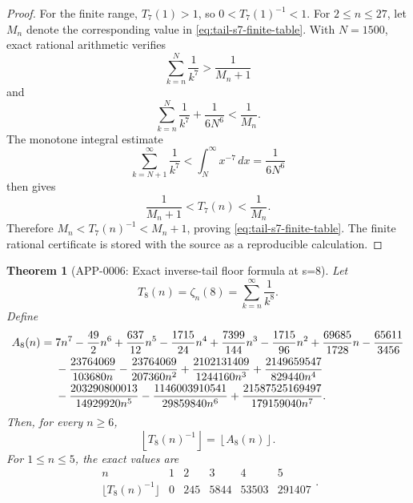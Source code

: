 \documentclass[11pt]{article}
\numberwithin{equation}{section}
\newtheorem{theorem}{Theorem}[section]
\theoremstyle{definition}
\theoremstyle{remark}
\newcommand{\1}{\mathbf 1}
\begin{document}
\begin{proof}
For the finite range, \(T_7(1)>1\), so \(0<T_7(1)^{-1}<1\).  For \(2\le n\le27\), let \(M_n\) denote the corresponding value in \eqref{eq:tail-s7-finite-table}.  With \(N=1500\), exact rational arithmetic verifies
\begin{equation}
\label{eq:tail-s7-finite-lower}
\sum_{k=n}^{N}\frac1{k^7}>\frac1{M_n+1}
\end{equation}
and
\begin{equation}
\label{eq:tail-s7-finite-upper}
\sum_{k=n}^{N}\frac1{k^7}+\frac1{6N^6}<\frac1{M_n}.
\end{equation}
The monotone integral estimate
\begin{equation}
\label{eq:tail-s7-integral-tail}
\sum_{k=N+1}^{\infty}\frac1{k^7}<\int_N^\infty x^{-7}\,dx=\frac1{6N^6}
\end{equation}
then gives
\begin{equation}
\label{eq:tail-s7-finite-window}
\frac1{M_n+1}<T_7(n)<\frac1{M_n}.
\end{equation}
Therefore \(M_n<T_7(n)^{-1}<M_n+1\), proving \eqref{eq:tail-s7-finite-table}.  The finite rational certificate is stored with the source as a reproducible calculation.
\end{proof}

\begin{theorem}[APP-0006: Exact inverse-tail floor formula at s=8]
\label{thm:tail-s8-floor}
Let
\begin{equation}
\label{eq:tail-s8}
T_8(n)=\zeta_n(8)=\sum_{k=n}^{\infty}\frac1{k^8}.
\end{equation}
Define
\begin{align}
\label{eq:tail-s8-a}
A_8(n)
={}&7n^7-\frac{49}{2}n^6+\frac{637}{12}n^5-\frac{1715}{24}n^4
+\frac{7399}{144}n^3-\frac{1715}{96}n^2+\frac{69685}{1728}n-\frac{65611}{3456}\notag\\
&-\frac{23764069}{103680n}
-\frac{23764069}{207360n^2}
+\frac{2102131409}{1244160n^3}
+\frac{2149659547}{829440n^4}\notag\\
&-\frac{203290800013}{14929920n^5}
-\frac{1146003910541}{29859840n^6}
+\frac{21587525169497}{179159040n^7}.
\end{align}
Then, for every \(n\ge6\),
\begin{equation}
\label{eq:tail-s8-floor}
\left\lfloor T_8(n)^{-1}\right\rfloor=\left\lfloor A_8(n)\right\rfloor.
\end{equation}
For \(1\le n\le5\), the exact values are
\begin{equation}
\label{eq:tail-s8-finite-table}
\begin{array}{c|rrrrr}
n&1&2&3&4&5\\
\hline
\lfloor T_8(n)^{-1}\rfloor&0&245&5844&53503&291407
\end{array}.
\end{equation}
\end{theorem}
\end{document}
